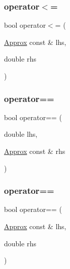 \subsubsection{\texorpdfstring{operator$<$=}{operator<=}\hspace{0.1cm}{\footnotesize\ttfamily [2/2]}}
{\footnotesize\ttfamily bool operator$<$= (\begin{DoxyParamCaption}\item[{\hyperlink{class_catch_1_1_detail_1_1_approx}{Approx} const \&}]{lhs,  }\item[{double}]{rhs }\end{DoxyParamCaption})\hspace{0.3cm}{\ttfamily [friend]}}

\mbox{\label{class_catch_1_1_detail_1_1_approx_ac766f044f1c63f0c5997982baefd9049}} 
\subsubsection{\texorpdfstring{operator==}{operator==}\hspace{0.1cm}{\footnotesize\ttfamily [1/2]}}
{\footnotesize\ttfamily bool operator== (\begin{DoxyParamCaption}\item[{double}]{lhs,  }\item[{\hyperlink{class_catch_1_1_detail_1_1_approx}{Approx} const \&}]{rhs }\end{DoxyParamCaption})\hspace{0.3cm}{\ttfamily [friend]}}

\mbox{\label{class_catch_1_1_detail_1_1_approx_a35999631e6cef569f9da9f3fa910db22}} 
\subsubsection{\texorpdfstring{operator==}{operator==}\hspace{0.1cm}{\footnotesize\ttfamily [2/2]}}
{\footnotesize\ttfamily bool operator== (\begin{DoxyParamCaption}\item[{\hyperlink{class_catch_1_1_detail_1_1_approx}{Approx} const \&}]{lhs,  }\item[{double}]{rhs }\end{DoxyParamCaption})\hspace{0.3cm}{\ttfamily [friend]}}

